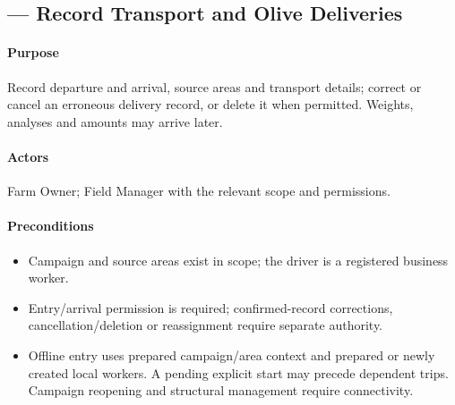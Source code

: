 \subsection{ --- Record Transport and Olive Deliveries}\label{uc:15}

\paragraph{Purpose}
Record departure and arrival, source areas and transport details; correct or cancel an erroneous delivery record, or delete it when permitted. Weights, analyses and amounts may arrive later.

\paragraph{Actors}
Farm Owner; Field Manager with the relevant scope and permissions.

\paragraph{Preconditions}
\begin{itemize}
\item Campaign and source areas exist in scope; the driver is a registered business worker.
\item Entry/arrival permission is required; confirmed-record corrections, cancellation/deletion or reassignment require separate authority.
\item Offline entry uses prepared campaign/area context and prepared or newly created local workers. A pending explicit start may precede dependent trips. Campaign reopening and structural management require connectivity.
\end{itemize}

